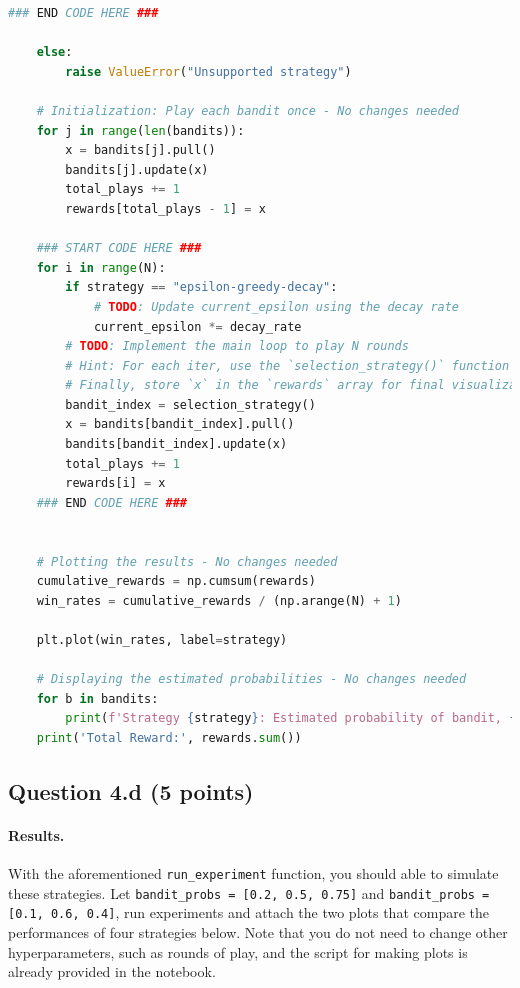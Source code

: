 \documentclass[12pt]{article}
\begin{document}
\begin{solution}
\begin{lstlisting}[language=Python]
    ### END CODE HERE ###
    
    else:
        raise ValueError("Unsupported strategy")
    
    # Initialization: Play each bandit once - No changes needed
    for j in range(len(bandits)):
        x = bandits[j].pull()
        bandits[j].update(x)
        total_plays += 1
        rewards[total_plays - 1] = x

    ### START CODE HERE ###
    for i in range(N):
        if strategy == "epsilon-greedy-decay":
            # TODO: Update current_epsilon using the decay rate
            current_epsilon *= decay_rate
        # TODO: Implement the main loop to play N rounds
        # Hint: For each iter, use the `selection_strategy()` function to obtain the bandit to pull, then simulate pulling that bandit and obtain new reward `x`. Update that bandit's estimate and the total number of plays.
        # Finally, store `x` in the `rewards` array for final visualization.
        bandit_index = selection_strategy()
        x = bandits[bandit_index].pull()
        bandits[bandit_index].update(x)
        total_plays += 1
        rewards[i] = x
    ### END CODE HERE ###
    

    # Plotting the results - No changes needed
    cumulative_rewards = np.cumsum(rewards)
    win_rates = cumulative_rewards / (np.arange(N) + 1)

    plt.plot(win_rates, label=strategy)

    # Displaying the estimated probabilities - No changes needed
    for b in bandits:
        print(f'Strategy {strategy}: Estimated probability of bandit, {b.p_estimate}')
    print('Total Reward:', rewards.sum())
\end{lstlisting}
\end{solution}

\subsection*{Question 4.d (5 points) } 
\paragraph{Results.}
With the aforementioned \texttt{run\_experiment} function, you should able to simulate these strategies. Let \texttt{bandit\_probs = [0.2, 0.5, 0.75]} and \texttt{bandit\_probs = [0.1, 0.6, 0.4]}, run experiments and attach the two plots that compare the performances of four strategies below. Note that you do not need to change other hyperparameters, such as rounds of play, and the script for making plots is already provided in the notebook.
\end{document}
